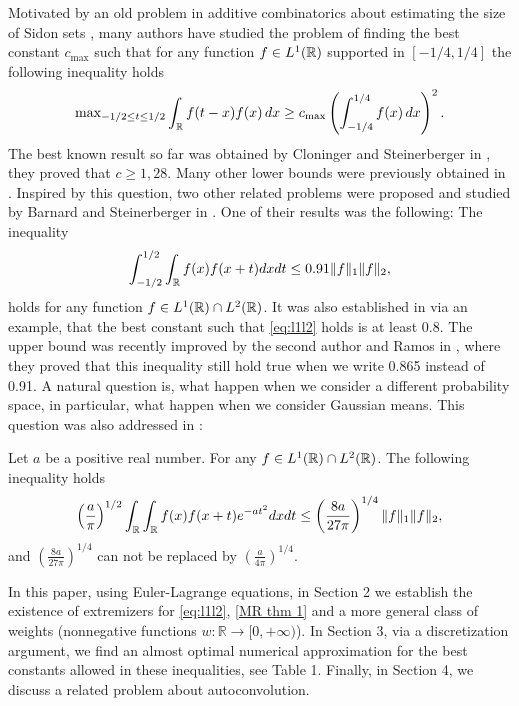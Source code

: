 
Motivated by an old problem in additive combinatorics about estimating the size of Sidon sets \cite{CRV}, many authors have studied the problem of finding the best constant $c_{\max}$ such that for any function $f\in L^{1}({\mathbb R})$ supported in $[-1/4,1/4]$ the following inequality holds
$$
\text{max}_{-1/2 \le t \le 1/2} \int_{{\mathbb R}} f(t-x)f(x) \, dx \ge c_{\max} \left(\int_{-1/4}^{1/4} f(x) \, dx\right)^2.
$$
The best known result so far was obtained by Cloninger and Steinerberger in \cite{CS}, they proved that $c \ge 1,28.$ Many other lower bounds were previously obtained in \cite{CRT,G,MOB1,Y,MOB2,MV}.
Inspired by this question, two other related problems were proposed and studied by Barnard and Steinerberger in \cite{BarnardSteinerberger}. One of their results was the following: The inequality
\begin{equation}\label{eq:l1l2}
\int_{-1/2}^{1/2}\int_{{\mathbb R}}f(x)f(x+t) dx dt\leq 0.91\|f\|_1\|f\|_2,
\end{equation}
holds for any function $f \in L^1({\mathbb R}) \cap L^2({\mathbb R})$. It was also established in \cite{BarnardSteinerberger} via an example, that the best constant such that \eqref{eq:l1l2} holds is at least 0.8.
The upper bound was recently improved by the second author
and Ramos in \cite{MR}, where they proved that this inequality still hold true when we write 0.865 instead of 0.91. A natural question is, what happen when we consider a different probability space, in particular, what happen when we consider Gaussian means. This question was also addressed in \cite{MR}:
\begin{proposition}\label{Thm JJ}
Let $a$ be a positive real number. For any $f\in L^{1}({\mathbb R})\cap L^{2}({\mathbb R})$. The following inequality holds
\begin{align}\label{MR thm 1}
\left(\frac{a}{\pi}\right)^{1/2}\int_{{\mathbb R}}\int_{{\mathbb R}}f(x)f(x+t)e^{-a t^{2}}dxdt\leq \left(\frac{8a}{27\pi}\right)^{1/4}\|f\|_1\|f\|_2,
\end{align}
and $\left(\frac{8a}{27\pi}\right)^{1/4}$ can not be replaced by $\left(\frac{a}{4\pi}\right)^{1/4}$. 
\end{proposition}

	In this paper, using Euler-Lagrange equations, in Section 2 we establish the existence of extremizers for \eqref{eq:l1l2}, \eqref{MR thm 1} and a more general class of weights (nonnegative functions $w:\mathbb{R}\to[0,+\infty)$). In Section 3, via a discretization argument, we find an almost optimal numerical approximation for the best constants allowed in these inequalities, see Table 1. Finally, in Section 4, we discuss a related problem about autoconvolution.\\ %
	

